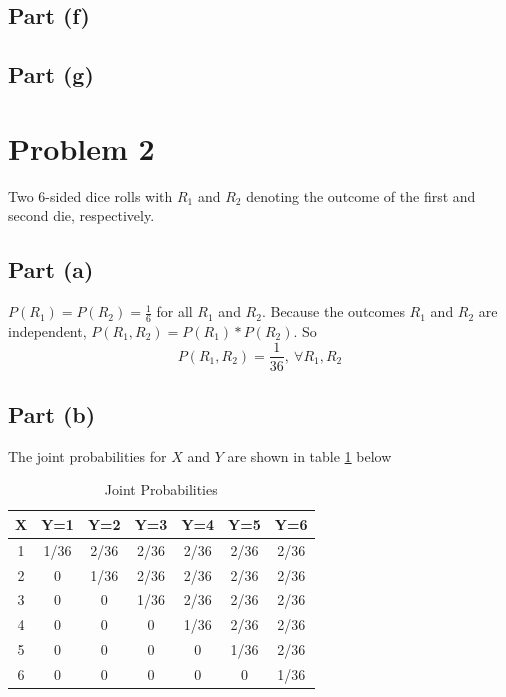 \documentclass[11pt]{article}
\begin{document}
\subsection*{Part (f)}
\subsection*{Part (g)}
\section*{Problem 2}
Two 6-sided dice rolls with $R_1$ and $R_2$ denoting the outcome of the first and second die, respectively.

\subsection*{Part (a)}
$P(R_1)=P(R_2)=\frac{1}{6}$ for all $R_1$ and $R_2$. Because the outcomes $R_1$ and $R_2$ are independent, $P(R_1,R_2)=P(R_1)*P(R_2)$. So
\begin{equation*}
	P(R_1,R_2)=\frac{1}{36},\ \forall R_1,R_2
\end{equation*}

\subsection*{Part (b)}
The joint probabilities for $X$ and $Y$ are shown in table \ref{joints} below
\begin{table}[h!]
  \begin{center}
    \caption{Joint Probabilities}
    \label{joints}
    \begin{tabular}{c|c|c|c|c|c|c} %
      X & Y=1 & Y=2 & Y=3 & Y=4 & Y=5 & Y=6 \\
      \hline
      1 & 1/36 & 2/36 & 2/36 & 2/36 & 2/36 & 2/36 \\
      2 & 0 & 1/36 & 2/36 & 2/36 & 2/36 & 2/36 \\
      3 & 0 & 0 & 1/36 & 2/36 & 2/36 & 2/36 \\
      4 & 0 & 0 & 0 & 1/36 & 2/36 & 2/36 \\
      5 & 0 & 0 & 0 & 0 & 1/36 & 2/36 \\
      6 & 0 & 0 & 0 & 0 & 0 & 1/36 \\
    \end{tabular}
  \end{center}
\end{table}
\end{document}
